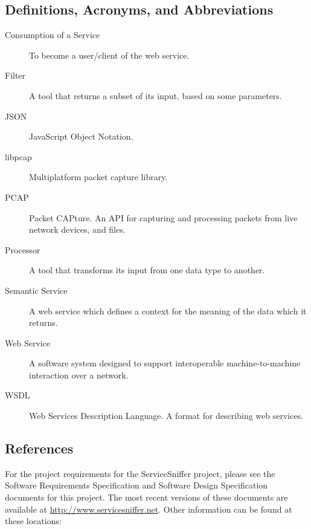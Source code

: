\documentclass[titlepage]{article}
\begin{document}

\subsection{Definitions, Acronyms, and Abbreviations%
  \label{definitions}%
}

\begin{description}
\item[Consumption of a Service]
    To become a user/client of the web service.

\item[Filter]
    A tool that returns a subset of its input, based on some parameters.

\item[JSON]
    JavaScript Object Notation.

\item[libpcap]
    Multiplatform packet capture library.

\item[PCAP]
    Packet CAPture.  An API for capturing and processing packets from live
    network devices, and files.

\item[Processor]
    A tool that transforms its input from one data type to another.

\item[Semantic Service]
    A web service which defines a context for the meaning of the data which it
    returns.

\item[Web Service]
    A software system designed to support interoperable machine-to-machine
    interaction over a network.

\item[WSDL]
    Web Services Description Language.  A format for describing web services.
\end{description}


\subsection{References%
  \label{references}%
}
    For the project requirements for the ServiceSniffer project, please see the
    Software Requirements Specification and Software Design Specification
    documents for this project.  The most recent versions of these documents
    are available at \url{http://www.servicesniffer.net}.  Other information
    can be found at these locations:
\end{document}
